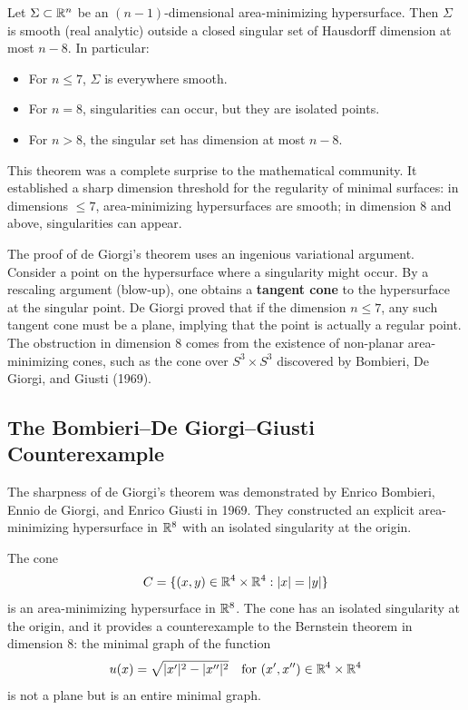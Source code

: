 \begin{theorem}
Let \(\Sigma \subset \mathbb{R}^n\) be an \((n-1)\)-dimensional area-minimizing hypersurface. Then \(\Sigma\) is smooth (real analytic) outside a closed singular set of Hausdorff dimension at most \(n-8\). In particular:
\begin{itemize}
    \item For \(n \leq 7\), \(\Sigma\) is everywhere smooth.
    \item For \(n = 8\), singularities can occur, but they are isolated points.
    \item For \(n > 8\), the singular set has dimension at most \(n-8\).
\end{itemize}
\end{theorem}

This theorem was a complete surprise to the mathematical community. It established a sharp dimension threshold for the regularity of minimal surfaces: in dimensions \(\leq 7\), area-minimizing hypersurfaces are smooth; in dimension 8 and above, singularities can appear.

The proof of de Giorgi's theorem uses an ingenious variational argument. Consider a point on the hypersurface where a singularity might occur. By a rescaling argument (blow-up), one obtains a \textbf{tangent cone} to the hypersurface at the singular point. De Giorgi proved that if the dimension \(n \leq 7\), any such tangent cone must be a plane, implying that the point is actually a regular point. The obstruction in dimension 8 comes from the existence of non-planar area-minimizing cones, such as the cone over \(S^3 \times S^3\) discovered by Bombieri, De Giorgi, and Giusti (1969).

\subsection{The Bombieri--De Giorgi--Giusti Counterexample}

The sharpness of de Giorgi's theorem was demonstrated by Enrico Bombieri, Ennio de Giorgi, and Enrico Giusti in 1969. They constructed an explicit area-minimizing hypersurface in \(\mathbb{R}^8\) with an isolated singularity at the origin.

\begin{theorem}
The cone
\[
C = \{ (x,y) \in \mathbb{R}^4 \times \mathbb{R}^4 : |x| = |y| \}
\]
is an area-minimizing hypersurface in \(\mathbb{R}^8\). The cone has an isolated singularity at the origin, and it provides a counterexample to the Bernstein theorem in dimension 8: the minimal graph of the function
\[
u(x) = \sqrt{|x'|^2 - |x''|^2} \quad \text{for } (x',x'') \in \mathbb{R}^4 \times \mathbb{R}^4
\]
is not a plane but is an entire minimal graph.
\end{theorem}

